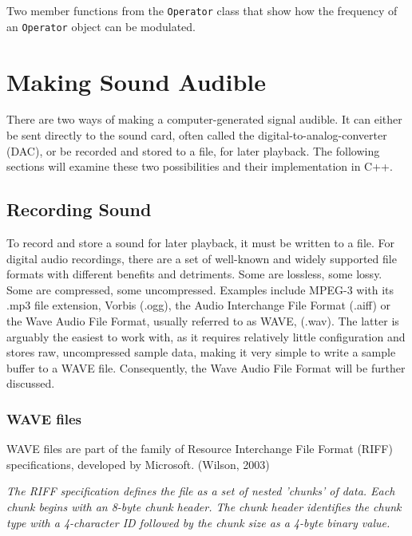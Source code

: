 \documentclass[12pt,twoside]{report}
\begin{document}
\begin{table}[hb!]
  \caption{Two member functions from the \texttt{Operator} class that show how the frequency of an \texttt{Operator} object can be modulated.}
  \label{code:operator}
\end{table}

\chapter{Making Sound Audible}

There are two ways of making a computer-generated signal audible. It can either be sent directly to the sound card, often called the digital-to-analog-converter (DAC), or be recorded and stored to a file, for later playback. The following sections will examine these two possibilities and their implementation in C++.

\section{Recording Sound}

To record and store a sound for later playback, it must be written to a file. For digital audio recordings, there are a set of well-known and widely supported file formats with different benefits and detriments. Some are lossless, some lossy. Some are compressed, some uncompressed. Examples include MPEG-3 with its .mp3 file extension, Vorbis (.ogg), the Audio Interchange File Format (.aiff) or the Wave Audio File Format, usually referred to as WAVE, (.wav). The latter is arguably the easiest to work with, as it requires relatively little configuration and stores raw, uncompressed sample data, making it very simple to write a sample buffer to a WAVE file. Consequently, the Wave Audio File Format will be further discussed.\\

\subsection{WAVE files}

\noindent WAVE files are part of the family of Resource Interchange File Format (RIFF) specifications, developed by Microsoft. (Wilson, 2003)

\begin{blockquote}
\emph{The RIFF specification defines the file as a set of nested 'chunks' of data. Each chunk begins with an 8-byte chunk header. The chunk header identifies the chunk type with a 4-character ID followed by the chunk size as a 4-byte binary value.} 
\end{blockquote}
\end{document}
